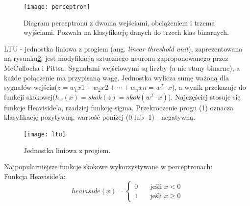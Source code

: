 \documentclass[a4paper,11pt]{article}
\begin{document}
    \bigskip

    \begin{figure}[H]
        \label{fig:perceptron}
        \centering
        \texttt{[image: perceptron]}
        \caption{Diagram perceptronu z dwoma wejściami, obciążeniem i trzema wyjściami. Pozwala na klasyfikację danych do trzech klas binarnych\cite{UczenieMaszynowe2018}.}
    \end{figure}

    \bigskip

    LTU - jednostka liniowa z progiem (ang. \textit{linear threshold unit}), zaprezentowana na rysunku\ref{fig:ltu}, jest modyfikacją sztucznego neuronu zaproponowanego przez McCullocha i Pittsa. Sygnałami wejściowymi są liczby (a nie stany binarne), a każde połączenie ma przypisaną wagę. Jednostka wylicza sumę ważoną dla sygnałów wejścia($z=w_{1}x{1} + w_{2}x{2} + \cdots + w_{n}x{n} = w^{T} \cdot x$), a wynik przekazuje do funkcji skokowej($h_{w}(x) = skok(z) = skok(w^{T} \cdot x)$). Najczęściej stosuje się funkcje Heaviside'a, rzadziej funkcję sigma. Przekroczenie progu (1) oznacza klasyfikację pozytywną, wartość poniżej (0 lub -1) - negatywną\cite{UczenieMaszynowe2018}.

    \bigskip

    \begin{figure}[H]
        \label{fig:ltu}
        \centering
        \texttt{[image: ltu]}
        \caption{Jednostka liniowa z progiem\cite{UczenieMaszynowe2018}.}
    \end{figure}

    \bigskip

    \noindent
    \begin{minipage}[H]{\textwidth}
        \setlength\parindent{17pt} Najpopularniejsze funkcje skokowe wykorzystywane w perceptronach: \\
        \bigskip
        \setlength\parindent{17pt} Funkcja Heaviside'a: \\
        \begin{equation}
            \label{eq:heaviside}
            heaviside(x) =
            \begin{cases}
                0 & \quad \text{jeśli } x < 0 \\
                1 & \quad \text{jeśli } x \geq 0
            \end{cases}
        \end{equation}
    \end{minipage}

    \smallskip
\end{document}
